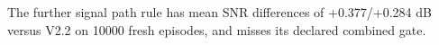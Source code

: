 The further signal path rule has mean SNR differences of +0.377/+0.284 dB versus V2.2 on 10000 fresh episodes, and misses its declared combined gate.
